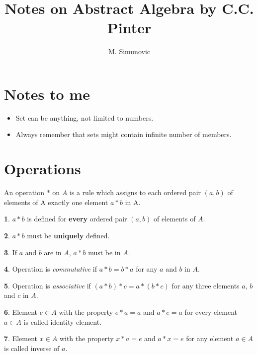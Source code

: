 \documentclass[a4paper,12pt]{article}
\title{Notes on Abstract Algebra by C.C. Pinter}
\author{M. Simunovic}
\theoremstyle{definition}
\newtheorem{definition}{}[section]
\theoremstyle{axiom}
\theoremstyle{theorem}
\begin{document}
\maketitle

\section{Notes to me}
\begin{itemize}
        \item Set can be anything, not limited to numbers.
        \item Always remember that sets might contain infinite number of members.
\end{itemize}
\section{Operations}
An operation $*$ on $A$ is a rule which assigns to each ordered pair $(a,b)$ of elements of A exactly one element $a * b$ in A.
\begin{definition}{}
        \textnormal{$a * b$ is defined for \textbf{every} ordered pair $(a, b)$ of elements of $A$.}
\end{definition}
\begin{definition}{}
        \textnormal{$a * b$ must be \textbf{uniquely} defined.}
\end{definition}
\begin{definition}{}
        \textnormal{If $a$ and $b$ are in $A$, $a * b$ must be in $A$.}
\end{definition}
\begin{definition}{}
        \textnormal{Operation is \textit{commutative} if $a * b = b * a$ for any $a$ and $b$ in $A$.}
\end{definition}
\begin{definition}{}
        \textnormal{Operation is \textit{associative} if $(a * b) * c = a * (b * c)$ for any three elements $a$, $b$ and $c$ in $A$.}
\end{definition}
\begin{definition}{}
        Element $e \in A$ with the property $e * a = a$ and $a * e = a$ for every element $a \in A$  is called identity element.
\end{definition}
\begin{definition}{}
        \textnormal{Element $x \in A$ with the property $x * a = e$ and $a * x = e$ for any element $a \in A$ is called inverse of $a$.}
\end{definition}
\end{document}
